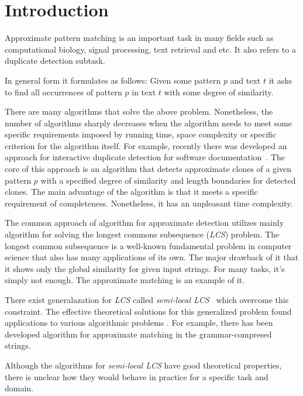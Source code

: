 \section{Introduction}
Approximate pattern matching is an important task in many fields such as computational biology, signal processing, text retrieval and etc.
It also refers to a duplicate detection subtask.

In general form it formulates as follows: Given some pattern $p$ and text $t$ it asks to find all occurrences of pattern $p$ in text $t$ with some degree of similarity.

There are many algorithms that solve the above problem.
Nonetheless, the number of algorithms sharply decreases  when the algorithm needs to meet some specific requirements imposed by running time, space complexity or specific criterion for the algorithm itself.
For example, recently there was developed an approach for interactive duplicate detection for software documentation~\cite{luciv2019interactive}.
The core of this approach is an algorithm that detects approximate clones of a given pattern $p$ with a specified degree of similarity and length boundaries for detected clones.
The main advantage of the algorithm is that it meets a specific requirement of completeness.
Nonetheless, it has an unpleasant time complexity.



    


The common approach of algorithm for approximate detection utilizes mainly algorithm for solving the longest commons subsequence (\emph{LCS}) problem.
The longest common subsequence is a well-known fundamental problem in computer science that also has many applications of its own.
The major drawback of it that it shows only the global similarity for given input strings.
For many tasks, it's simply not enough.
The approximate matching is an example of it.

There exist generalazation for \emph{LCS} called \emph{semi-local LCS}~\cite{} which overcome this constraint. 
The effective theoretical solutions for this generalized problem found applications to various algorithmic problems .
For example, there has been developed algorithm for approximate matching in the grammar-compresed strings\cite{}.

Although the algorithms for \emph{semi-local LCS} have good theoretical properties, there is unclear how they would behave in practice for a specific task and domain.

